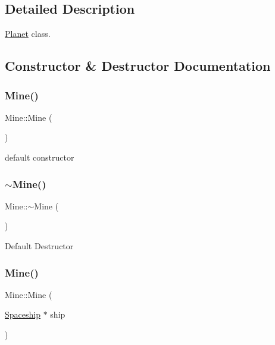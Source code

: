 \subsection{Detailed Description}
\hyperlink{classPlanet}{Planet} class. 

\subsection{Constructor \& Destructor Documentation}
\mbox{\label{classMine_a84f100c1d6797402ab2220d2ad699be2}} 
\subsubsection{\texorpdfstring{Mine()}{Mine()}\hspace{0.1cm}{\footnotesize\ttfamily [1/2]}}
{\footnotesize\ttfamily Mine\+::\+Mine (\begin{DoxyParamCaption}{ }\end{DoxyParamCaption})}

default constructor \mbox{\label{classMine_abfde171f93b463d81d5b18f767a3a37c}} 
\subsubsection{\texorpdfstring{$\sim$\+Mine()}{~Mine()}}
{\footnotesize\ttfamily Mine\+::$\sim$\+Mine (\begin{DoxyParamCaption}{ }\end{DoxyParamCaption})}

Default Destructor \mbox{\label{classMine_a3a7383f5c2f0f98b7d2c0cb2a9a67073}} 
\subsubsection{\texorpdfstring{Mine()}{Mine()}\hspace{0.1cm}{\footnotesize\ttfamily [2/2]}}
{\footnotesize\ttfamily Mine\+::\+Mine (\begin{DoxyParamCaption}\item[{\hyperlink{classSpaceship}{Spaceship} $\ast$}]{ship }\end{DoxyParamCaption})\hspace{0.3cm}{\ttfamily [inline]}}


